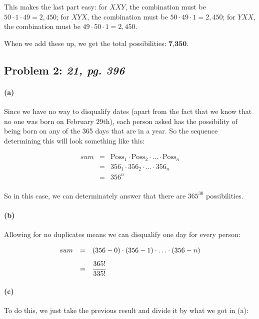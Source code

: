 \documentclass[a4paper]{article}
\begin{document}
This makes the last part easy: for $XXY$, the combination must be $50 \cdot 1 \cdot 49 = 2,450$; for $XYX$, the combination must be $50 \cdot 49 \cdot 1 = 2,450$; for $YXX$, the combination must be $49 \cdot 50 \cdot 1 = 2,450$.

When we add these up, we get the total possibilities: $\textbf{7,350}$.

\subsection*{Problem 2: \textit{21, pg. 396}}

\paragraph{(a)} Since we have no way to disqualify dates (apart from the fact that we know that no one was born on February 29th), each person asked has the possibility of being born on any of the 365 days that are in a year. So the sequence determining this will look something like this:

\begin{equation}
\begin{array}{rll}
sum & = & \mbox{Poss}_1 \cdot \mbox{Poss}_2 \cdot \ldots \cdot \mbox{Poss}_n \\
& = & 356_1 \cdot 356_2 \cdot \ldots \cdot 356_n \\
& = & 356^n \\
\end{array}
\end{equation}	

So in this case, we can determinately answer that there are $365^{30}$ possibilities.

\paragraph{(b)} Allowing for no duplicates means we can disqualify one day for every person:

\begin{equation}
\begin{array}{rll}
sum & = & (356-0) \cdot (356-1) \cdot \ldots \cdot (356-n) \\[.1in]
& = & \cfrac{365!}{335!} \\
\end{array}
\end{equation}	

\paragraph{(c)} To do this, we just take the previous result and divide it by what we got in (a):
\end{document}
